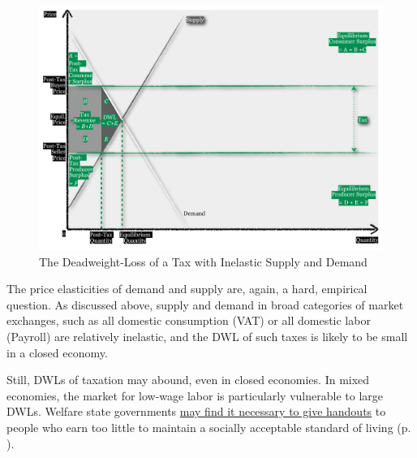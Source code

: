 \begin{figure}[htbp]
	\centering
	\includegraphics[width=1\textwidth]{./img/smaller-DWL}  
	\caption[Deadweight-Loss of a Tax with Inelastic Suppy and Demand]{The Deadweight-Loss of a Tax with Inelastic Supply and Demand}
	\label{fig:smaller-DWL}
\end{figure}

The price elasticities of demand and supply are, again, a hard, empirical question. As discussed above, supply and demand in broad categories of market exchanges, such as all domestic consumption (\gls{VAT}) or all domestic labor (\gls{Payroll}) are relatively inelastic, and the \gls{DWL} of such taxes is likely to be small in a closed economy.

Still, \glspl{DWL} of taxation may abound, even in closed economies. In mixed economies, the market for low-wage labor is particularly vulnerable to large \gls{DWL}s. Welfare state governments  \hyperref[sec:distribution]{may find it necessary to give handouts} to people who earn too little to maintain a socially acceptable standard of living (p. \pageref{sec:distribution}). 

